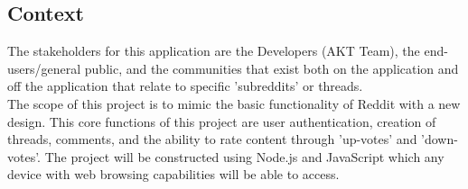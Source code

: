\documentclass[12pt,fleqn]{article}
\begin{document}
\subsection{Context}

The stakeholders for this application are the Developers (AKT Team), the end-users/general public, and the communities that exist both on the application and off the application that relate to specific 'subreddits' or threads.\\
\newline
The scope of this project is to mimic the basic functionality of Reddit with a new design.  This core functions of this project are user authentication, creation of threads, comments, and the ability to rate content through 'up-votes' and 'down-votes'.  The project will be constructed using Node.js and JavaScript which any device with web browsing capabilities will be able to access.   
\end{document}
